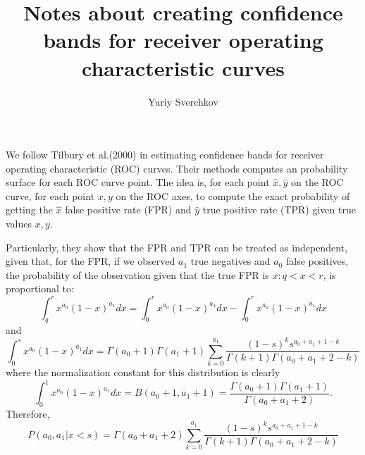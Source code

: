 \documentclass{article}
\title{Notes about creating confidence bands for receiver operating characteristic curves}
\author{Yuriy Sverchkov}
\begin{document}
\maketitle

We follow Tilbury et al.(2000) in estimating confidence bands for receiver operating characteristic (ROC) curves.
Their methods computes an probability surface for each ROC curve point.
The idea is, for each point $\hat x, \hat y$ on the ROC curve, for each point $x, y$ on the ROC axes, to compute the exact probability of getting the $\hat x$ false positive rate (FPR) and $\hat y$ true positive rate (TPR) given true values $x, y$.

Particularly, they show that the FPR and TPR can be treated as independent, given that, for the FPR, if we observed $a_1$ true negatives and $a_0$ false positives, the probability of the observation given that the true FPR is $x: q < x < r$, is proportional to:
\begin{equation}
 \int_q^r x^{a_0} (1-x)^{a_1} dx = \int_0^r x^{a_0} (1-x)^{a_1} dx - \int_0^r x^{a_0} (1-x)^{a_1} dx
\end{equation}
and
\begin{equation}
\int_0^s x^{a_0} (1-x)^{a_1} dx = \Gamma(a_0+1) \Gamma(a_1+1) \sum_{k=0}^{a_1} \frac{(1-s)^k s^{a_0 + a_1 + 1 - k}}{\Gamma(k+1) \Gamma(a_0 + a_1 + 2 - k)}
\end{equation}
where the normalization constant for this distribution is clearly
\begin{equation}
\int_0^1 x^{a_0} (1-x)^{a_1} dx = B(a_0+1, a_1+1) = \frac{\Gamma(a_0+1) \Gamma(a_1+1)}{\Gamma(a_0+a_1+2)} \text{.}
\end{equation}
Therefore,
\begin{equation}
P(a_0, a_1 | x<s) = \Gamma(a_0+a_1+2) \sum_{k=0}^{a_1} \frac{(1-s)^k s^{a_0 + a_1 + 1 - k}}{\Gamma(k+1) \Gamma(a_0 + a_1 + 2 - k)}
\end{equation}
\end{document}
